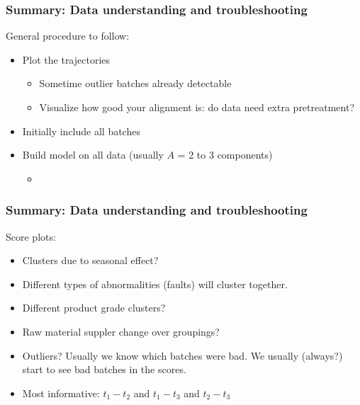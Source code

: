 
\begin{frame}\frametitle{Summary: Data understanding and troubleshooting}
	
General procedure to follow:	

	\begin{itemize}
		\item	Plot the trajectories\hfill {}
	
				\begin{itemize}
					\item	Sometime outlier batches already detectable
				
					\item	Visualize how good your alignment is: do data need extra pretreatment?
				\end{itemize}
			
		\item	Initially include all batches
	
		\item	Build model on all data (usually \( A \) = 2 to 3 components)
		
				\begin{itemize}
					\item	{}
				\end{itemize}
	\end{itemize}
\end{frame}

\begin{frame}\frametitle{Summary: Data understanding and troubleshooting}
	
	Score plots:\hfill {}

	\begin{itemize}
		\item	Clusters due to seasonal effect?
		
		\item	Different types of abnormalities (faults) will cluster together.
		
		\item	Different product grade clusters?
		
		\item	Raw material suppler change over groupings?
		
		\item	Outliers? Usually we know which batches were bad.  We usually (always?) start to see bad batches in the scores.
		
		\item	Most informative: \( t_1 - t_2 \) and \( t_1 - t_3 \) and \( t_2 - t_3 \)
	\end{itemize}

\end{frame}


